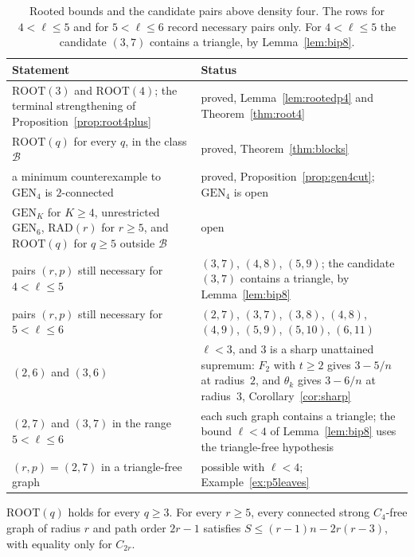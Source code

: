 \documentclass[ASNA]{USG}
\theoremstyle{WBstyletwo}
\numberwithin{equation}{section}
\newcommand{\lr}{\ell}
\newcommand{\pp}{p}
\newcommand{\GEN}{\mathrm{GEN}}
\newcommand{\RAD}{\mathrm{RAD}}
\newcommand{\ROOT}{\mathrm{ROOT}}
\begin{document}
\begin{table}[ht]
\centering\small
\begin{tabular}{@{}p{8.2cm}>{\raggedright\arraybackslash}p{5.4cm}@{}}
\toprule
Statement & Status\\
\midrule
$\ROOT(3)$ and $\ROOT(4)$; the terminal strengthening of Proposition~\ref{prop:root4plus} & proved, Lemma~\ref{lem:rootedp4} and Theorem~\ref{thm:root4}\\
$\ROOT(q)$ for every $q$, in the class $\mathcal B$ & proved, Theorem~\ref{thm:blocks}\\
a minimum counterexample to $\GEN_4$ is $2$-connected & proved, Proposition~\ref{prop:gen4cut}; $\GEN_4$ is open\\
$\GEN_K$ for $K\ge 4$, unrestricted $\GEN_6$, $\RAD(r)$ for $r\ge 5$, and $\ROOT(q)$ for $q\ge 5$ outside $\mathcal B$ & open\\
pairs $(r,\pp)$ still necessary for $4<\lr\le 5$ & $(3,7)$, $(4,8)$, $(5,9)$; the candidate $(3,7)$ contains a triangle, by Lemma~\ref{lem:bip8}\\
pairs $(r,\pp)$ still necessary for $5<\lr\le 6$ & $(2,7)$, $(3,7)$, $(3,8)$, $(4,8)$, $(4,9)$, $(5,9)$, $(5,10)$, $(6,11)$\\
$(2,6)$ and $(3,6)$ & $\lr<3$, and $3$ is a sharp unattained supremum: $F_2$ with $t\ge 2$ gives $3-5/n$ at radius~$2$, and $\theta_k$ gives $3-6/n$ at radius~$3$, Corollary~\ref{cor:sharp}\\
$(2,7)$ and $(3,7)$ in the range $5<\lr\le 6$ & each such graph contains a triangle; the bound $\lr<4$ of Lemma~\ref{lem:bip8} uses the triangle-free hypothesis\\
$(r,\pp)=(2,7)$ in a triangle-free graph & possible with $\lr<4$; Example~\ref{ex:p5leaves}\\
\bottomrule
\end{tabular}
\caption{Rooted bounds and the candidate pairs above density four. The rows for $4<\lr\le 5$ and for $5<\lr\le 6$ record necessary pairs only. For $4<\lr\le 5$ the candidate $(3,7)$ contains a triangle, by Lemma~\ref{lem:bip8}.}\label{tab:high}
\end{table}

\begin{conjecture}\label{conj:uniform}
$\ROOT(q)$ holds for every $q\ge 3$. For every $r\ge 5$, every connected strong $C_4$-free graph of radius $r$ and path order $2r-1$ satisfies $S\le(r-1)n-2r(r-3)$, with equality only for $C_{2r}$.
\end{conjecture}
\end{document}
